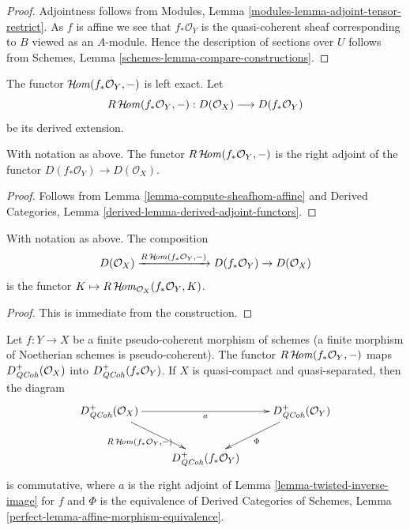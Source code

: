 \begin{proof}
Adjointness follows from
Modules, Lemma \ref{modules-lemma-adjoint-tensor-restrict}.
As $f$ is affine we see that $f_*\mathcal{O}_Y$ is
the quasi-coherent sheaf corresponding to $B$ viewed
as an $A$-module. Hence the description of sections over $U$ follows from
Schemes, Lemma \ref{schemes-lemma-compare-constructions}.
\end{proof}

\noindent
The functor $\mathop{\mathcal{H}\!\mathit{om}}\nolimits(f_*\mathcal{O}_Y, -)$ is left exact. Let
$$
R\mathop{\mathcal{H}\!\mathit{om}}\nolimits(f_*\mathcal{O}_Y, -) :
D(\mathcal{O}_X)
\longrightarrow
D(f_*\mathcal{O}_Y)
$$
be its derived extension.

\begin{lemma}
\label{lemma-sheafhom-affine-adjoint}
With notation as above. The functor $R\mathop{\mathcal{H}\!\mathit{om}}\nolimits(f_*\mathcal{O}_Y, -)$
is the right adjoint of the functor $D(f_*\mathcal{O}_Y) \to D(\mathcal{O}_X)$.
\end{lemma}

\begin{proof}
Follows from Lemma \ref{lemma-compute-sheafhom-affine}
and
Derived Categories, Lemma \ref{derived-lemma-derived-adjoint-functors}.
\end{proof}

\begin{lemma}
\label{lemma-sheafhom-affine-ext}
With notation as above. The composition
$$
D(\mathcal{O}_X) \xrightarrow{R\mathop{\mathcal{H}\!\mathit{om}}\nolimits(f_*\mathcal{O}_Y, -)}
D(f_*\mathcal{O}_Y) \to D(\mathcal{O}_X)
$$
is the functor $K \mapsto R\mathop{\mathcal{H}\!\mathit{om}}\nolimits_{\mathcal{O}_X}(f_*\mathcal{O}_Y, K)$.
\end{lemma}

\begin{proof}
This is immediate from the construction.
\end{proof}

\begin{lemma}
\label{lemma-finite-twisted}
Let $f : Y \to X$ be a finite pseudo-coherent morphism of schemes
(a finite morphism of Noetherian schemes is pseudo-coherent).
The functor $R\mathop{\mathcal{H}\!\mathit{om}}\nolimits(f_*\mathcal{O}_Y, -)$ maps
$D_{\mathit{QCoh}}^+(\mathcal{O}_X)$ into $D_{\mathit{QCoh}}^+(f_*\mathcal{O}_Y)$.
If $X$ is quasi-compact and quasi-separated, then the diagram
$$
\xymatrix{
D_\QCoh^+(\mathcal{O}_X) \ar[rr]_a \ar[rd]_{R\SheafHom(f_*\mathcal{O}_Y, -)}
& & D_\QCoh^+(\mathcal{O}_Y) \ar[ld]^\Phi \\
& D_\QCoh^+(f_*\mathcal{O}_Y)
}
$$
is commutative, where $a$ is the right adjoint of
Lemma \ref{lemma-twisted-inverse-image} for $f$ and $\Phi$ is the equivalence
of Derived Categories of Schemes, Lemma
\ref{perfect-lemma-affine-morphism-equivalence}.
\end{lemma}


